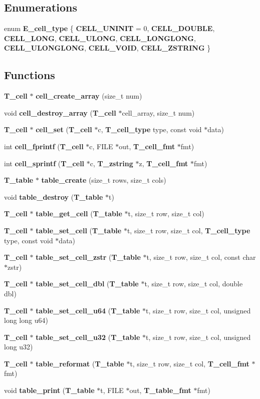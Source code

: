 \subsection*{Enumerations}
\begin{CompactItemize}
\item 
enum {\bf E\_\-cell\_\-type} \{ {\bf CELL\_\-UNINIT} =  0, 
{\bf CELL\_\-DOUBLE}, 
{\bf CELL\_\-LONG}, 
{\bf CELL\_\-ULONG}, 
{\bf CELL\_\-LONGLONG}, 
{\bf CELL\_\-ULONGLONG}, 
{\bf CELL\_\-VOID}, 
{\bf CELL\_\-ZSTRING}
 \}
\end{CompactItemize}
\subsection*{Functions}
\begin{CompactItemize}
\item 
{\bf T\_\-cell} $\ast$ {\bf cell\_\-create\_\-array} (size\_\-t num)
\item 
void {\bf cell\_\-destroy\_\-array} ({\bf T\_\-cell} $\ast$cell\_\-array, size\_\-t num)
\item 
{\bf T\_\-cell} $\ast$ {\bf cell\_\-set} ({\bf T\_\-cell} $\ast$c, {\bf T\_\-cell\_\-type} type, const void $\ast$data)
\item 
int {\bf cell\_\-fprintf} ({\bf T\_\-cell} $\ast$c, FILE $\ast$out, {\bf T\_\-cell\_\-fmt} $\ast$fmt)
\item 
int {\bf cell\_\-sprintf} ({\bf T\_\-cell} $\ast$c, {\bf T\_\-zstring} $\ast$z, {\bf T\_\-cell\_\-fmt} $\ast$fmt)
\item 
{\bf T\_\-table} $\ast$ {\bf table\_\-create} (size\_\-t rows, size\_\-t cols)
\item 
void {\bf table\_\-destroy} ({\bf T\_\-table} $\ast$t)
\item 
{\bf T\_\-cell} $\ast$ {\bf table\_\-get\_\-cell} ({\bf T\_\-table} $\ast$t, size\_\-t row, size\_\-t col)
\item 
{\bf T\_\-cell} $\ast$ {\bf table\_\-set\_\-cell} ({\bf T\_\-table} $\ast$t, size\_\-t row, size\_\-t col, {\bf T\_\-cell\_\-type} type, const void $\ast$data)
\item 
{\bf T\_\-cell} $\ast$ {\bf table\_\-set\_\-cell\_\-zstr} ({\bf T\_\-table} $\ast$t, size\_\-t row, size\_\-t col, const char $\ast$zstr)
\item 
{\bf T\_\-cell} $\ast$ {\bf table\_\-set\_\-cell\_\-dbl} ({\bf T\_\-table} $\ast$t, size\_\-t row, size\_\-t col, double dbl)
\item 
{\bf T\_\-cell} $\ast$ {\bf table\_\-set\_\-cell\_\-u64} ({\bf T\_\-table} $\ast$t, size\_\-t row, size\_\-t col, unsigned long long u64)
\item 
{\bf T\_\-cell} $\ast$ {\bf table\_\-set\_\-cell\_\-u32} ({\bf T\_\-table} $\ast$t, size\_\-t row, size\_\-t col, unsigned long u32)
\item 
{\bf T\_\-cell} $\ast$ {\bf table\_\-reformat} ({\bf T\_\-table} $\ast$t, size\_\-t row, size\_\-t col, {\bf T\_\-cell\_\-fmt} $\ast$fmt)
\item 
void {\bf table\_\-print} ({\bf T\_\-table} $\ast$t, FILE $\ast$out, {\bf T\_\-table\_\-fmt} $\ast$fmt)
\end{CompactItemize}
